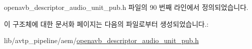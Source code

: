 openavb\+\_\+descriptor\+\_\+audio\+\_\+unit\+\_\+pub.\+h 파일의 90 번째 라인에서 정의되었습니다.



이 구조체에 대한 문서화 페이지는 다음의 파일로부터 생성되었습니다.\+:\begin{DoxyCompactItemize}
\item 
lib/avtp\+\_\+pipeline/aem/\hyperlink{openavb__descriptor__audio__unit__pub_8h}{openavb\+\_\+descriptor\+\_\+audio\+\_\+unit\+\_\+pub.\+h}\end{DoxyCompactItemize}
